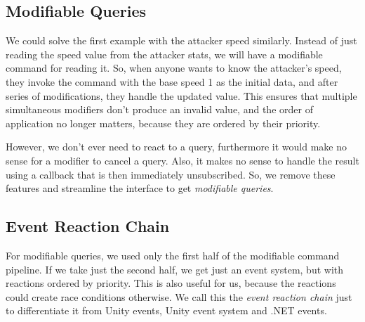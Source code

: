 \subsection{Modifiable Queries}

We could solve the first example with the attacker speed similarly.
Instead of just reading the speed value from the attacker stats, we will have a modifiable command for reading it.
So, when anyone wants to know the attacker's speed, they invoke the command with the base speed 1 as the initial data, and after series of modifications, they handle the updated value.
This ensures that multiple simultaneous modifiers don't produce an invalid value, and the order of application no longer matters, because they are ordered by their priority.

However, we don't ever need to react to a query, furthermore it would make no sense for a modifier to cancel a query.
Also, it makes no sense to handle the result using a callback that is then immediately unsubscribed.
So, we remove these features and streamline the interface to get \emph{modifiable queries}.

\subsection{Event Reaction Chain}

For modifiable queries, we used only the first half of the modifiable command pipeline.
If we take just the second half, we get just an event system, but with reactions ordered by priority.
This is also useful for us, because the reactions could create race conditions otherwise.
We call this the \emph{event reaction chain} just to differentiate it from Unity events, Unity event system and .NET events.